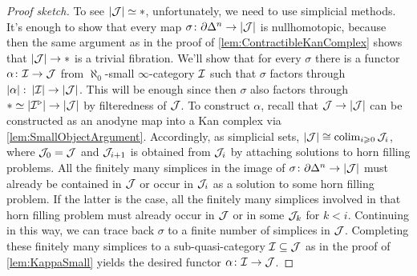 \begin{proof}[Proof sketch]
	To see $\left|\mathcal{J}\right|\simeq *$, unfortunately, we need to use simplicial methods. It's enough to show that every map $\sigma\colon \partial\Delta^n\rightarrow\left|\mathcal{J}\right|$ is nullhomotopic, because then the same argument as in the proof of \cref{lem:ContractibleKanComplex} shows that $\left|\mathcal{J}\right|\rightarrow*$ is a trivial fibration. We'll show that for every $\sigma$ there is a functor $\alpha\colon\mathcal{I}\rightarrow \mathcal{J}$ from $\aleph_0$-small $\infty$-category $\mathcal{I}$ such that $\sigma$ factors through $\left|\alpha\right|\colon\left|\mathcal{I}\right|\rightarrow \left|\mathcal{J}\right|$. This will be enough since then $\sigma$ also factors through $*\simeq \left|\mathcal{I}^\triangleright\right|\rightarrow\left|\mathcal{J}\right|$ by filteredness of $\mathcal{J}$. To construct $\alpha$, recall that $\mathcal{J}\rightarrow\left|\mathcal{J}\right|$ can be constructed as an anodyne map into a Kan complex via \cref{lem:SmallObjectArgument}. Accordingly, as simplicial sets, $\left|\mathcal{J}\right|\cong \operatorname*{colim}_{i\geqslant 0}\mathcal{J}_i$, where $\mathcal{J}_0=\mathcal{J}$ and $\mathcal{J}_{i+1}$ is obtained from $\mathcal{J}_i$ by attaching solutions to horn filling problems. All the finitely many simplices in the image of $\sigma\colon\partial\Delta^n\rightarrow\left|\mathcal{J}\right|$ must already be contained in $\mathcal{J}$ or occur in $\mathcal{J}_i$ as a solution to some horn filling problem. If the latter is the case, all the finitely many simplices involved in that horn filling problem must already occur in $\mathcal{J}$ or in some $\mathcal{J}_k$ for $k<i$. Continuing in this way, we can trace back $\sigma$ to a finite number of simplices in $\mathcal{J}$. Completing these finitely many simplices to a sub-quasi-category $\mathcal{I}\subseteq\mathcal{J}$ as in the proof of \cref{lem:KappaSmall} yields the desired functor $\alpha\colon \mathcal{I}\rightarrow\mathcal{J}$. %
	

\end{proof}
